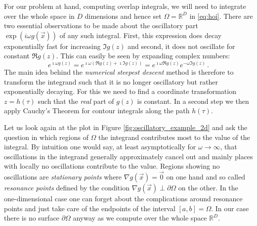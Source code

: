 \documentclass[a4paper,10pt]{article}
\begin{document}
For our problem at hand, computing overlap integrals, we will need to integrate
over the whole space in $D$ dimensions and hence set $\Omega = \mathbb{R}^D$ in
\eqref{eq:hoi}.
There are two essential observations to be made about the
oscillatory part $\exp\left(i\omega g\left(\vec{x}\right) \right)$
of any such integral. First, this expression does decay exponentially
fast for increasing $\Im g(z)$ and second, it does not oscillate for
constant $\Re g(z)$. This can easily be seen by expanding complex numbers:
\begin{equation*}
  e^{\imath \omega g(z)}
  =
  e^{\imath \omega (\Re g(z) + \imath \Im g(z))}
  =
  e^{\imath \omega \Re g(z)}
  e^{- \omega \Im g(z)} \,.
\end{equation*}
The main idea behind the \emph{numerical steepest descent} method is therefore
to transform the integrand such that it is no longer oscillatory but
rather exponentially decaying. For this we need to find a coordinate
transformation $z = h(\tau)$ such that the \emph{real} part of $g(z)$
is constant. In a second step we then apply Cauchy's Theorem for contour
integrals along the path $h(\tau)$.

Let us look again at the plot in Figure \ref{fig:oscillatory_example_2d}
and ask the question in which regions of $\Omega$ the integrand contributes most
to the value of the integral. By intuition one would say, at least asymptotically
for $\omega \rightarrow \infty$, that oscillations in the integrand generally approximately
cancel out and mainly places with locally no oscillations contribute to the value.
Regions showing no oscillations are \emph{stationary points} where
$\nabla g(\vec{x}) = \vec{0}$ on one hand and so called \emph{resonance points}
defined by the condition $\nabla g(\vec{x}) \perp \partial \Omega$ on the other.
In the one-dimensional case one can forget about the complications around resonance
points and just take care of the endpoints of the interval $[a, b] = \Omega$. In our
case there is no surface $\partial \Omega$ anyway as we compute over the whole space
$\mathbb{R}^D$.
\end{document}
